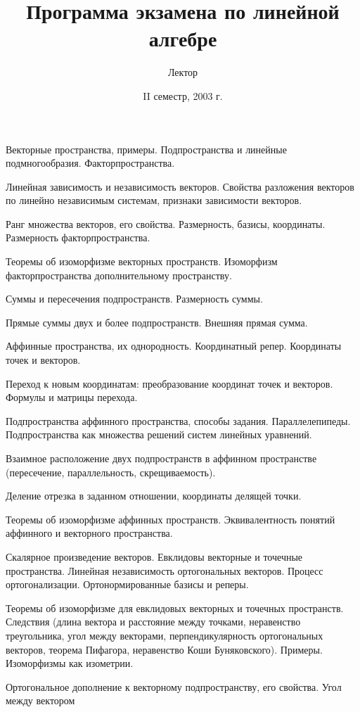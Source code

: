 \documentclass[a4paper]{article}
\title{Программа экзамена по линейной алгебре}
\author{Лектор\т \framebox{Е.\,Г.\,Скляренко}}
\date{II семестр, 2003 г.}
\begin{document}
\maketitle

\begin{nums}{-2}
\item Векторные пространства, примеры. Подпространства
 и линейные подмногообразия. Факторпространства.
\item Линейная зависимость и независимость векторов. Свойства
разложения векторов по линейно независимым системам, признаки зависимости векторов.
\item Ранг множества векторов, его свойства. Размерность, базисы, координаты.
Размерность факторпространства.
\item Теоремы об изоморфизме векторных пространств. Изоморфизм
факторпространства дополнительному пространству.
\item Суммы и пересечения подпространств. Размерность суммы.
\item Прямые суммы двух и более подпространств. Внешняя прямая сумма.
\item Аффинные пространства, их однородность. Координатный репер.
 Координаты точек и векторов.
\item Переход к новым координатам: преобразование координат точек и векторов.
Формулы и матрицы перехода.
\item Подпространства аффинного пространства, способы задания. Параллелепипеды.
Подпространства как множества решений систем линейных уравнений.
\item Взаимное расположение двух подпространств в аффинном пространстве (пересечение,
параллельность, скрещиваемость).
\item Деление отрезка в заданном отношении, координаты делящей точки.
\item Теоремы об изоморфизме аффинных пространств. Эквивалентность понятий аффинного
и векторного пространства.
\item Скалярное произведение векторов. Евклидовы векторные и точечные пространства.
Линейная независимость ортогональных векторов. Процесс ортогонализации. Ортонормированные базисы и реперы.
\item Теоремы об изоморфизме для евклидовых векторных и точечных пространств.
Следствия (длина вектора и расстояние между точками, неравенство треугольника, угол между
векторами, перпендикулярность ортогональных векторов, теорема Пифагора, неравенство Коши\ч
Буняковского). Примеры. Изоморфизмы как изометрии.
\item Ортогональное дополнение к векторному подпространству, его свойства. Угол между вектором

\end{nums}
\end{document}
